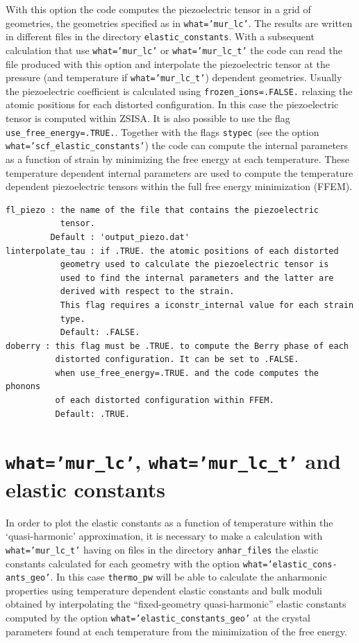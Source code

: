 \documentclass[12pt,a4paper,twoside]{report}
\begin{document}
With this option the code computes the piezoelectric tensor in a grid 
of geometries, the geometries specified as in \texttt{what='mur\_lc'}.
The results are written in different files in the directory 
\texttt{elastic\_constants}. With a subsequent calculation that
use \texttt{what='mur\_lc'} or \texttt{what='mur\_lc\_t'} the code
can read the file produced with this option and interpolate the
piezoelectric tensor at the pressure (and temperature if 
\texttt{what='mur\_lc\_t'}) dependent geometries. 
Usually the piezoelectric coefficient is calculated using
\texttt{frozen\_ions=.FALSE.} relaxing the atomic positions for 
each distorted configuration. In this case the piezoelectric tensor 
is computed within ZSISA.
It is also possible to use the flag \texttt{use\_free\_energy=.TRUE.}. 
Together with the flags \texttt{stypec} 
(see the option \texttt{what='scf\_elastic\_constants'}) 
the code can compute the internal parameters as a function of strain
by minimizing the free energy at each temperature. These temperature 
dependent internal 
parameters are used to compute the temperature dependent piezoelectric
tensors within the full free energy minimization (FFEM).

\begin{verbatim}
fl_piezo : the name of the file that contains the piezoelectric 
           tensor.
         Default : 'output_piezo.dat'
linterpolate_tau : if .TRUE. the atomic positions of each distorted 
           geometry used to calculate the piezoelectric tensor is
           used to find the internal parameters and the latter are
           derived with respect to the strain.
           This flag requires a iconstr_internal value for each strain
           type. 
           Default: .FALSE.
doberry : this flag must be .TRUE. to compute the Berry phase of each
          distorted configuration. It can be set to .FALSE. 
          when use_free_energy=.TRUE. and the code computes the phonons
          of each distorted configuration within FFEM.
          Default: .TRUE.
\end{verbatim}

\newpage
{\color{coral}\section{\texttt{what='mur\_lc'}, \texttt{what='mur\_lc\_t'} and elastic constants}}
\color{black}

In order to plot the elastic constants as a function of temperature 
within the `quasi-harmonic' approximation,
it is necessary to make a calculation with \texttt{what='mur\_lc\_t'} 
having on files in the directory \texttt{anhar\_files} the elastic 
constants calculated for each geometry 
with the option \texttt{what='elastic\_cons-} \texttt{ants\_geo'}. 
In this case \texttt{thermo\_pw} will be able to calculate the anharmonic 
properties using temperature dependent elastic constants and bulk moduli 
obtained by interpolating the ``fixed-geometry quasi-harmonic'' elastic 
constants computed by the option \texttt{what='elastic\_constants\_geo'} 
at the crystal parameters found at each temperature from the minimization 
of the free energy. 
\end{document}

